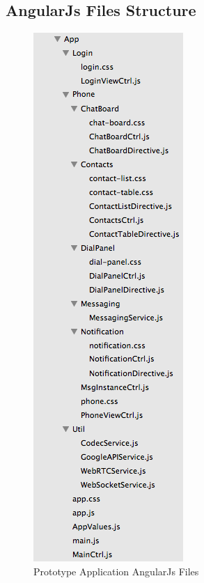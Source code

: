 \begin{appendices}
\section{AngularJs Files Structure}
\label{code:angularjs_structure}

\begin{figure}
	\centering
    	\includegraphics[height=0.45\textheight,natwidth=610,natheight=642]{figs/angularjs_structure.png}
  	\caption{Prototype Application AngularJs Files}
  	\label{fig:angularjs_structure}
\end{figure}

\end{appendices}
